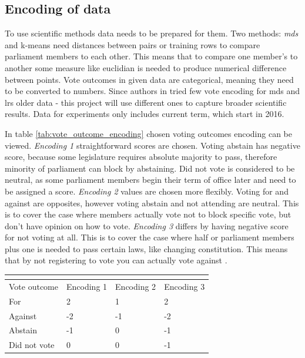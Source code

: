 \documentclass[a4paper,12pt]{article}
\begin{document}
	
	\hfill 
	
	\subsection{Encoding of data} 
	
	To use scientific methods data needs to be prepared for them. Two methods: \textit{\acrshort{mds}} and \gls{k-means} need distances between pairs or training rows to compare parliament members to each other. This means that to compare one member's to another some measure like \gls{euclidian} is needed to produce numerical difference between points. Vote outcomes in given data are categorical, meaning they need to be converted to numbers. Since authors in  \cite{vytautas_mick_magistrinis} tried few vote encoding for \acrshort{mds} and \gls{lrs} older data - this project will use different ones to capture broader scientific results. Data for experiments only includes current term, which start in 2016.
	
	In table \ref{tab:vote_outcome_encoding} chosen voting outcomes encoding can be viewed. \textit{Encoding 1} straightforward scores are chosen. Voting abstain has negative score, because some legislature requires absolute majority to pass, therefore minority of parliament can block by abstaining. Did not vote is considered to be neutral, as some parliament members begin their term of office later and need to be assigned a score. \textit{Encoding 2} values are chosen more flexibly. Voting for and against are opposites, however voting abstain and not attending are neutral. This is to cover the case where members actually vote not to block specific vote, but don't have opinion on how to vote. \textit{Encoding 3} differs by having negative score for not voting at all. This is to cover the case where half or parliament members plus one is needed to pass certain laws, like changing constitution. This means that by not registering to vote you can actually vote against \cite{konstitucija}.
	
	\noindent
	\begin{center}
		\begin{tabular}{L{3cm} C{2cm} C{2cm} C{2cm}}
			\\ 
			\hline
			Vote outcome & Encoding 1 & Encoding 2& Encoding 3  \\\hline
			For & 2 & 1 & 2 \\
			Against & -2 & -1 & -2\\
			Abstain & -1 & 0 & -1\\
			Did not vote & 0 & 0 & -1\\
			\hline
		\end{tabular}
		 \label{tab:vote_outcome_encoding}
	\end{center}
	
\end{document}
